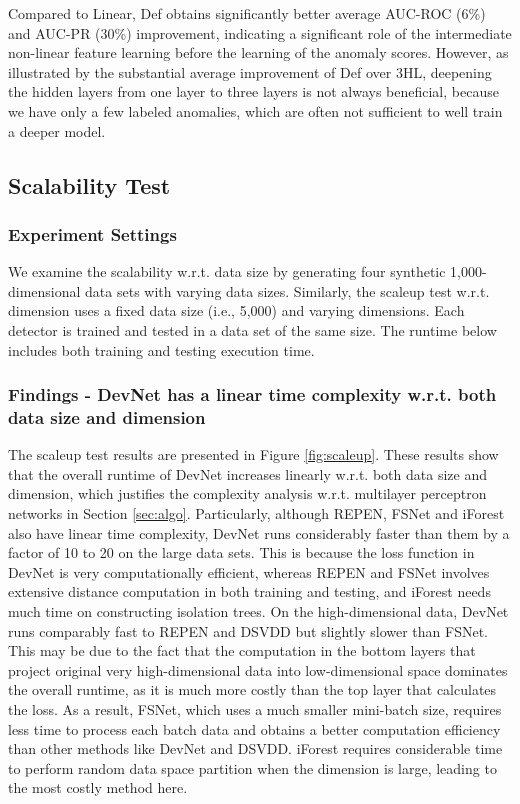 \documentclass[sigconf]{acmart}
\begin{document}
Compared to Linear, Def obtains significantly better average AUC-ROC (6\%) and AUC-PR (30\%) improvement, indicating a significant role of the intermediate non-linear feature learning before the learning of the anomaly scores. However, as illustrated by the substantial average improvement of Def over 3HL, deepening the hidden layers from one layer to three layers is not always beneficial, because we have only a few labeled anomalies, which are often not sufficient to well train a deeper model.

\subsection{Scalability Test}

\subsubsection{Experiment Settings} 
We examine the scalability w.r.t. data size by generating four synthetic 1,000-dimensional data sets with varying data sizes. Similarly, the scaleup test w.r.t. dimension uses a fixed data size (i.e., 5,000) and varying dimensions. Each detector is trained and tested in a data set of the same size. The runtime below includes both training and testing execution time.

\subsubsection{Findings - DevNet has a linear time complexity w.r.t. both data size and dimension}

The scaleup test results are presented in Figure \ref{fig:scaleup}. These results show that the overall runtime of DevNet increases linearly w.r.t. both data size and dimension, which justifies the complexity analysis w.r.t. multilayer perceptron networks in Section \ref{sec:algo}. Particularly, although REPEN, FSNet and iForest also have linear time complexity, DevNet runs considerably faster than them by a factor of 10 to 20 on the large data sets. This is because the loss function in DevNet is very computationally efficient, whereas REPEN and FSNet involves extensive distance computation in both training and testing, and iForest needs much time on constructing isolation trees. On the high-dimensional data, DevNet runs comparably fast to REPEN and DSVDD but slightly slower than FSNet. This may be due to the fact that the computation in the bottom layers that project original very high-dimensional data into low-dimensional space dominates the overall runtime, as it is much more costly than the top layer that calculates the loss. As a result, FSNet, which uses a much smaller mini-batch size, requires less time to process each batch data and obtains a better computation efficiency than other methods like DevNet and DSVDD. iForest requires considerable time to perform random data space partition when the dimension is large, leading to the most costly method here.
\end{document}
